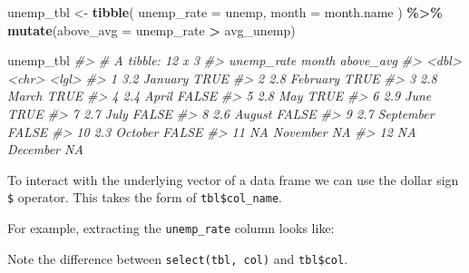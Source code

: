 \documentclass[
]{book}
\newenvironment{Shaded}{\begin{snugshade}}{\end{snugshade}}
\newcommand{\CommentTok}[1]{\textcolor[rgb]{0.56,0.35,0.01}{\textit{#1}}}
\newcommand{\DataTypeTok}[1]{\textcolor[rgb]{0.13,0.29,0.53}{#1}}
\newcommand{\KeywordTok}[1]{\textcolor[rgb]{0.13,0.29,0.53}{\textbf{#1}}}
\newcommand{\NormalTok}[1]{#1}
\newcommand{\OperatorTok}[1]{\textcolor[rgb]{0.81,0.36,0.00}{\textbf{#1}}}
\newcommand{\StringTok}[1]{\textcolor[rgb]{0.31,0.60,0.02}{#1}}
\begin{document}
\begin{Shaded}
\begin{Highlighting}[]
\NormalTok{unemp\_tbl \textless{}{-}}\StringTok{ }\KeywordTok{tibble}\NormalTok{(}
  \DataTypeTok{unemp\_rate =}\NormalTok{ unemp, }
  \DataTypeTok{month =}\NormalTok{ month.name}
\NormalTok{) }\OperatorTok{\%\textgreater{}\%}\StringTok{ }
\StringTok{  }\KeywordTok{mutate}\NormalTok{(}\DataTypeTok{above\_avg =}\NormalTok{ unemp\_rate }\OperatorTok{\textgreater{}}\StringTok{ }\NormalTok{avg\_unemp)}

\NormalTok{unemp\_tbl}
\CommentTok{\#\textgreater{} \# A tibble: 12 x 3}
\CommentTok{\#\textgreater{}    unemp\_rate month     above\_avg}
\CommentTok{\#\textgreater{}         \textless{}dbl\textgreater{} \textless{}chr\textgreater{}     \textless{}lgl\textgreater{}    }
\CommentTok{\#\textgreater{}  1        3.2 January   TRUE     }
\CommentTok{\#\textgreater{}  2        2.8 February  TRUE     }
\CommentTok{\#\textgreater{}  3        2.8 March     TRUE     }
\CommentTok{\#\textgreater{}  4        2.4 April     FALSE    }
\CommentTok{\#\textgreater{}  5        2.8 May       TRUE     }
\CommentTok{\#\textgreater{}  6        2.9 June      TRUE     }
\CommentTok{\#\textgreater{}  7        2.7 July      FALSE    }
\CommentTok{\#\textgreater{}  8        2.6 August    FALSE    }
\CommentTok{\#\textgreater{}  9        2.7 September FALSE    }
\CommentTok{\#\textgreater{} 10        2.3 October   FALSE    }
\CommentTok{\#\textgreater{} 11       NA   November  NA       }
\CommentTok{\#\textgreater{} 12       NA   December  NA}
\end{Highlighting}
\end{Shaded}

To interact with the underlying vector of a data frame we can use the dollar sign \texttt{\$} operator. This takes the form of \texttt{tbl\$col\_name}.

For example, extracting the \texttt{unemp\_rate} column looks like:

\begin{Shaded}
\end{Shaded}

Note the difference between \texttt{select(tbl,\ col)} and \texttt{tbl\$col}.
\end{document}
